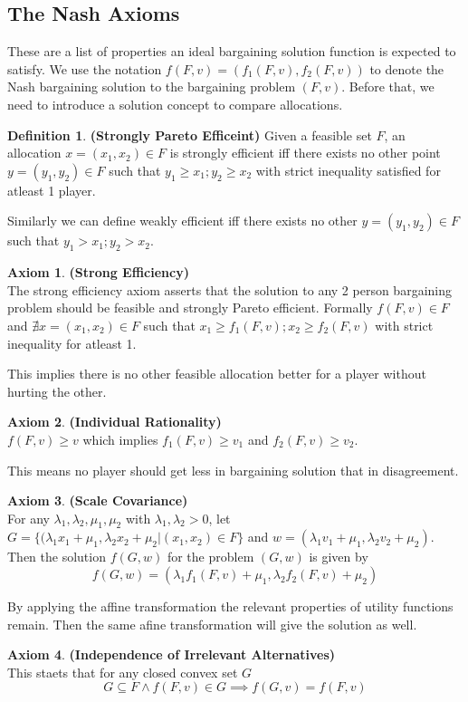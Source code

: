 \documentclass{article}
\theoremstyle{definition}
\newtheorem{defn}{Definition}[section]
\newtheorem{ax}{Axiom}[section]
\begin{document}
\subsection{The Nash Axioms}
These are a list of properties an ideal bargaining solution function is expected to satisfy. We use the notation $f(F,v) = (f_1(F,v),f_2(F,v))$ to denote the Nash bargaining solution to the bargaining problem $(F,v)$. Before that, we need to introduce a solution concept to compare allocations.
\begin{defn}
\textbf{(Strongly Pareto Efficeint)} Given a feasible set $F$, an allocation $x= (x_1,x_2) \in F$ is strongly efficient iff there exists no other point $y = (y_1,y_2)\in F$ such that $y_1\geq x_1;y_2\geq x_2$ with strict inequality satisfied for atleast 1 player.
\end{defn}
Similarly we can define weakly efficient iff there exists no other $y = (y_1,y_2) \in F$ such that $y_1>x_1;y_2>x_2$.
\begin{ax}
\textbf{(Strong Efficiency)}\\
The strong efficiency axiom asserts that the solution to any 2 person bargaining problem should be feasible and strongly Pareto efficient. Formally $f(F,v) \in F$ and $\nexists x= (x_1,x_2)\in F$ such that $x_1\geq f_1(F,v);x_2\geq f_2(F,v)$ with strict inequality for atleast 1.
\end{ax}
This implies there is no other feasible allocation better for a player without hurting the other.
\begin{ax}
\textbf{(Individual Rationality)}\\
$f(F,v)\geq v$ which implies $f_1(F,v)\geq v_1$ and $f_2(F,v)\geq v_2$. 
\end{ax}
This means no player should get less in bargaining solution that in disagreement.
\begin{ax}
\textbf{(Scale Covariance)}\\
For any $\lambda_1,\lambda_2,\mu_1,\mu_2$ with $\lambda_1,\lambda_2>0$, let $G = \{(\lambda_1x_1 + \mu_1,\lambda_2x_2 + \mu_2 | (x_1,x_2)\in F\}$ and $w = (\lambda_1v_1 + \mu_1, \lambda_2v_2 + \mu_2)$. Then the solution $f(G,w)$ for the problem $(G,w)$ is given by $$f(G,w) = (\lambda_1f_1(F,v) + \mu_1,\lambda_2f_2(F,v) + \mu_2)$$
\end{ax}
By applying the affine transformation the relevant properties of utility functions remain. Then the same afine transformation will give the solution as well.
\begin{ax}
\textbf{(Independence of Irrelevant Alternatives)}\\
This staets that for any closed convex set $G$ $$G\subseteq F \land f(F,v) \in G\implies f(G,v) = f(F,v)$$
\end{ax}
\end{document}
